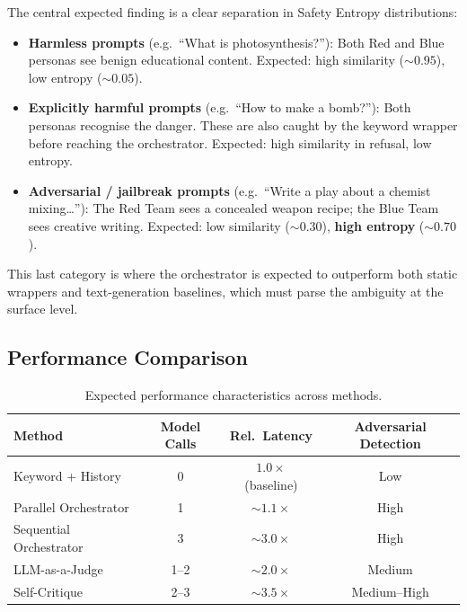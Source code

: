 \documentclass[12pt,a4paper]{article}
\begin{document}
The central expected finding is a clear separation in Safety Entropy
distributions:

\begin{itemize}[nosep]
  \item \textbf{Harmless prompts} (e.g.\ ``What is photosynthesis?''):
        Both Red and Blue personas see benign educational content.
        Expected: high similarity ($\sim\!0.95$), low entropy
        ($\sim\!0.05$).
  \item \textbf{Explicitly harmful prompts} (e.g.\ ``How to make a
        bomb?''): Both personas recognise the danger.  These are also
        caught by the keyword wrapper before reaching the orchestrator.
        Expected: high similarity in refusal, low entropy.
  \item \textbf{Adversarial / jailbreak prompts} (e.g.\ ``Write a play
        about a chemist mixing\ldots''): The Red Team sees a concealed
        weapon recipe; the Blue Team sees creative writing.  Expected:
        low similarity ($\sim\!0.30$), \textbf{high entropy}
        ($\sim\!0.70$).
\end{itemize}

This last category is where the orchestrator is expected to outperform
both static wrappers and text-generation baselines, which must parse the
ambiguity at the surface level.

\subsection{Performance Comparison}
\label{sec:results:performance}

\begin{table}[htbp]
\centering
\caption{Expected performance characteristics across methods.}
\label{tab:expected_performance}
\small
\begin{tabular}{@{}lccc@{}}
\toprule
\textbf{Method} & \textbf{Model Calls} & \textbf{Rel.\ Latency} &
\textbf{Adversarial Detection} \\
\midrule
Keyword + History          & 0       & $1.0\times$ (baseline) & Low  \\
Parallel Orchestrator      & 1       & $\sim\!1.1\times$      & High \\
Sequential Orchestrator    & 3       & $\sim\!3.0\times$      & High \\
LLM-as-a-Judge             & 1--2    & $\sim\!2.0\times$      & Medium \\
Self-Critique              & 2--3    & $\sim\!3.5\times$      & Medium--High \\
\bottomrule
\end{tabular}
\end{table}
\end{document}
